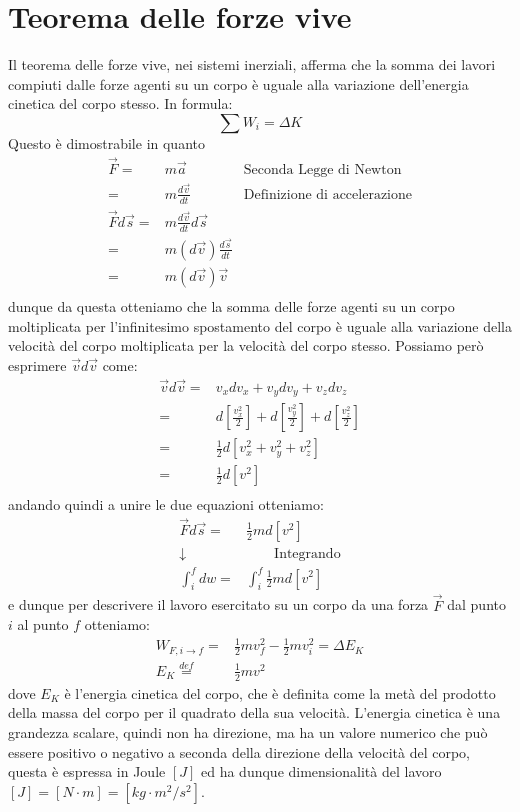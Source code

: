 \section{Teorema delle forze vive}
    Il teorema delle forze vive, nei sistemi inerziali, afferma che la somma dei lavori compiuti dalle forze agenti su un corpo è uguale alla variazione dell'energia cinetica del corpo stesso. In formula:
    \begin{equation}
        \sum W_{i} = \Delta K
    \end{equation}
    Questo è dimostrabile in quanto
    $$
        \begin{aligned}
            \vec{F} =& m\vec{a} \qquad & \text{Seconda Legge di Newton}\\
            =& m\frac{d\vec{v}}{dt} \qquad & \text{Definizione di accelerazione}\\
            \vec{F}d\vec{s} =& m\frac{d\vec{v}}{dt}d\vec{s}\\
            =& m(d\vec{v})\frac{d\vec{s}}{dt}\\
            =& m(d\vec{v})\vec{v}\\
        \end{aligned}
    $$
    dunque da questa otteniamo che la somma delle forze agenti su un corpo moltiplicata per l'infinitesimo spostamento del corpo è uguale alla variazione della velocità del corpo moltiplicata per la velocità del corpo stesso. Possiamo però esprimere $\vec{v}d\vec{v}$ come:
    $$
        \begin{aligned}
            \vec{v}d\vec{v} =& v_xdv_x + v_ydv_y + v_zdv_z\\
            =&d\left[\frac{v_x^2}2\right] + d\left[\frac{v_y^2}2\right] + d\left[\frac{v_z^2}2\right]\\
            =& \frac12d\left[v_x^2 + v_y^2 + v_z^2\right]\\
            =& \frac12d\left[v^2\right]\\
        \end{aligned}
    $$
    andando quindi a unire le due equazioni otteniamo:
    $$
        \begin{aligned}
            \vec{F}d\vec{s} =& \frac12m d\left[v^2\right]\\
            \downarrow & \qquad \text{Integrando}\\
            \int_i^f dw =& \int_i^f \frac12m d\left[v^2\right]
        \end{aligned}
    $$
    e dunque per descrivere il lavoro esercitato su un corpo da una forza $\vec{F}$ dal punto $i$ al punto $f$ otteniamo:
    \begin{align}
        W_{F,i\to f} =& \frac12mv_f^2-\frac12mv_i^2 = \Delta E_K \\
        E_K \stackrel{def}{=}& \frac12mv^2
    \end{align}
    dove $E_K$ è l'energia cinetica del corpo, che è definita come la metà del prodotto della massa del corpo per il quadrato della sua velocità. L'energia cinetica è una grandezza scalare, quindi non ha direzione, ma ha un valore numerico che può essere positivo o negativo a seconda della direzione della velocità del corpo, questa è espressa in Joule $[J]$ ed ha dunque dimensionalità del lavoro $[J] = [N\cdot m] = [kg\cdot m^2/s^2]$.
